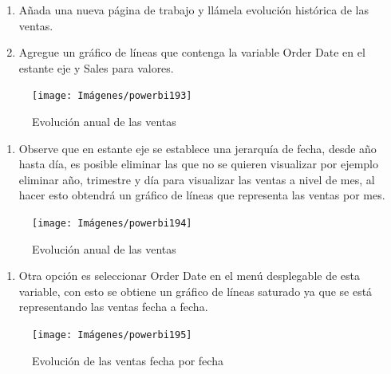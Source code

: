 \documentclass[
]{book}
\providecommand{\tightlist}{%
  \setlength{\itemsep}{0pt}\setlength{\parskip}{0pt}}
\begin{document}
\begin{enumerate}
\def\labelenumi{\arabic{enumi}.}
\item
  Añada una nueva página de trabajo y llámela evolución histórica de las ventas.
\item
  Agregue un gráfico de líneas que contenga la variable Order Date en el estante eje y Sales para valores.
\end{enumerate}

\begin{figure}

{\centering \texttt{[image: Imágenes/powerbi193]} 

}

\caption{Evolución anual de las ventas}\label{fig:paso2pronosticopowerbi-fig}
\end{figure}

\begin{enumerate}
\def\labelenumi{\arabic{enumi}.}
\setcounter{enumi}{2}
\tightlist
\item
  Observe que en estante eje se establece una jerarquía de fecha, desde año hasta día, es posible eliminar las que no se quieren visualizar por ejemplo eliminar año, trimestre y día para visualizar las ventas a nivel de mes, al hacer esto obtendrá un gráfico de líneas que representa las ventas por mes.
\end{enumerate}

\begin{figure}

{\centering \texttt{[image: Imágenes/powerbi194]} 

}

\caption{Evolución anual de las ventas}\label{fig:paso3pronosticopowerbi-fig}
\end{figure}

\begin{enumerate}
\def\labelenumi{\arabic{enumi}.}
\setcounter{enumi}{3}
\tightlist
\item
  Otra opción es seleccionar Order Date en el menú desplegable de esta variable, con esto se obtiene un gráfico de líneas saturado ya que se está representando las ventas fecha a fecha.
\end{enumerate}

\begin{figure}

{\centering \texttt{[image: Imágenes/powerbi195]} 

}

\caption{Evolución de las ventas fecha por fecha}\label{fig:paso4pronosticopowerbi-fig}
\end{figure}
\end{document}
